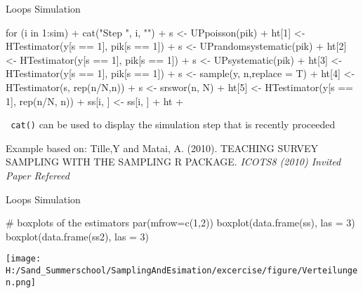 \documentclass[11pt,german,hideothersubsections]{beamer}
\newcommand{\R}[1]{{\tt \color{blue}  #1}}
\begin{document}
\begin{frame}[fragile]{Loops} {Simulation}
\footnotesize{
\begin{Schunk}
\begin{Sinput}
 for (i in 1:sim) {
+     cat("Step ", i, "\n")
+     s <- UPpoisson(pik)
+     ht[1] <- HTestimator(y[s == 1], pik[s == 1])
+     s <- UPrandomsystematic(pik)
+     ht[2] <- HTestimator(y[s == 1], pik[s == 1])
+     s <- UPsystematic(pik)
+     ht[3] <- HTestimator(y[s == 1], pik[s == 1])
+     s <- sample(y, n,replace = T)
+     ht[4] <- HTestimator(s, rep(n/N,n))
+     s <- srswor(n, N)
+     ht[5] <- HTestimator(y[s == 1], rep(n/N, n))
+     ss[i, ] <- ss[i, ] + ht 
+   } 
\end{Sinput}
\end{Schunk}
}
\begin{itemize}\footnotesize{
\item \R{cat()} can be used to display the simulation step that is recently proceeded
}
\end{itemize}
\tiny{Example based on: Tille,Y and Matai, A. (2010). TEACHING SURVEY SAMPLING WITH THE SAMPLING R PACKAGE. \emph{ICOTS8 (2010) Invited Paper Refereed}}
\end{frame}
\begin{frame}[fragile]{Loops} {Simulation}
\footnotesize{
\begin{Schunk}
\begin{Sinput}
 # boxplots of the estimators
   par(mfrow=c(1,2))
   boxplot(data.frame(ss), las = 3) 
   boxplot(data.frame(ss2), las = 3)
\end{Sinput}
\end{Schunk}
}
\texttt{[image: H:/Sand\_Summerschool/SamplingAndEsimation/excercise/figure/Verteilungen.png]}

\end{frame}
\end{document}
